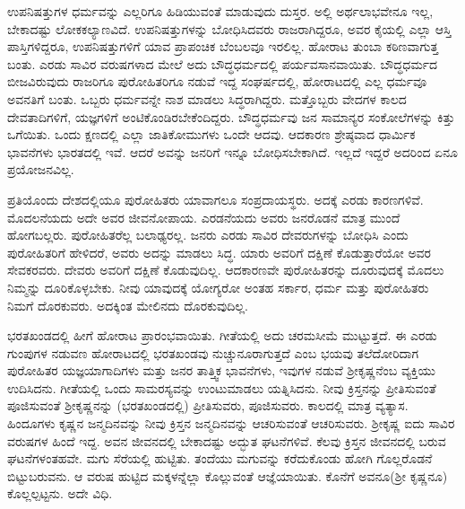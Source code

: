 ಉಪನಿಷತ್ತುಗಳ ಧರ್ಮವನ್ನು ಎಲ್ಲರಿಗೂ ಹಿಡಿಯುವಂತೆ ಮಾಡುವುದು ದುಸ್ತರ. ಅಲ್ಲಿ ಅರ್ಥಲಾಭವೇನೂ ಇಲ್ಲ, ಬೇಕಾದಷ್ಟು ಲೋಕಕಲ್ಯಾಣವಿದೆ. ಉಪನಿಷತ್ತುಗಳನ್ನು ಬೋಧಿಸಿದವರು ರಾಜರಾಗಿದ್ದರೂ, ಅವರ ಕೈಯಲ್ಲಿ ಎಲ್ಲಾ ಆಸ್ತಿ ಪಾಸ್ತಿಗಳಿದ್ದರೂ, ಉಪನಿಷತ್ತುಗಳಿಗೆ ಯಾವ ಪ್ರಾಪಂಚಿಕ ಬೆಂಬಲವೂ ಇರಲಿಲ್ಲ. ಹೋರಾಟ ತುಂಬಾ ಕಠಿಣವಾಗುತ್ತ ಬಂತು. ಎರಡು ಸಾವಿರ ವರುಷಗಳಾದ ಮೇಲೆ ಅದು ಬೌದ್ಧಧರ್ಮದಲ್ಲಿ ಪರ್ಯವಸಾನವಾಯಿತು. ಬೌದ್ಧಧರ್ಮದ ಬೀಜವಿರುವುದು ರಾಜರಿಗೂ ಪುರೋಹಿತರಿಗೂ ನಡುವೆ ಇದ್ದ ಸಂಘರ್ಷದಲ್ಲಿ, ಹೋರಾಟದಲ್ಲಿ ಎಲ್ಲ ಧರ್ಮವೂ ಅವನತಿಗೆ ಬಂತು. ಒಬ್ಬರು ಧರ್ಮವನ್ನೇ ನಾಶ ಮಾಡಲು ಸಿದ್ಧರಾಗಿದ್ದರು. ಮತ್ತೊಬ್ಬರು ವೇದಗಳ ಕಾಲದ ದೇವತಾದಿಗಳಿಗೆ, ಯಜ್ಞಗಳಿಗೆ ಅಂಟಿಕೊಂಡಿರಬೇಕೆಂದಿದ್ದರು. ಬೌದ್ಧಧರ್ಮವು ಜನ ಸಾಮಾನ್ಯರ ಸಂಕೋಲೆಗಳನ್ನು ಕಿತ್ತು ಒಗೆಯಿತು. ಒಂದು ಕ್ಷಣದಲ್ಲಿ ಎಲ್ಲಾ ಜಾತಿಕೋಮುಗಳು ಒಂದೇ ಆದವು. ಆದಕಾರಣ ಶ್ರೇಷ್ಠವಾದ ಧಾರ್ಮಿಕ ಭಾವನೆಗಳು ಭಾರತದಲ್ಲಿ ಇವೆ. ಆದರೆ ಅವನ್ನು ಜನರಿಗೆ ಇನ್ನೂ ಬೋಧಿಸಬೇಕಾಗಿದೆ. ಇಲ್ಲದೆ ಇದ್ದರೆ ಅದರಿಂದ ಏನೂ ಪ್ರಯೋಜನವಿಲ್ಲ.

ಪ್ರತಿಯೊಂದು ದೇಶದಲ್ಲಿಯೂ ಪುರೋಹಿತರು ಯಾವಾಗಲೂ ಸಂಪ್ರದಾಯಸ್ಥರು. ಅದಕ್ಕೆ ಎರಡು ಕಾರಣಗಳಿವೆ. ಮೊದಲನೆಯದು ಅದೇ ಅವರ ಜೀವನೋಪಾಯ. ಎರಡನೆಯದು ಅವರು ಜನರೊಡನೆ ಮಾತ್ರ ಮುಂದೆ ಹೋಗಬಲ್ಲರು. ಪುರೋಹಿತರೆಲ್ಲ ಬಲಾಢ್ಯರಲ್ಲ. ಜನರು ಎರಡು ಸಾವಿರ ದೇವರುಗಳನ್ನು ಬೋಧಿಸಿ ಎಂದು ಪುರೋಹಿತರಿಗೆ ಹೇಳಿದರೆ, ಅವರು ಅದನ್ನು ಮಾಡಲು ಸಿದ್ಧ. ಯಾರು ಅವರಿಗೆ ದಕ್ಷಿಣೆ ಕೊಡುತ್ತಾರೆಯೋ ಅವರ ಸೇವಕರವರು. ದೇವರು ಅವರಿಗೆ ದಕ್ಷಿಣೆ ಕೊಡುವುದಿಲ್ಲ. ಆದಕಾರಣವೇ ಪುರೋಹಿತರನ್ನು ದೂರುವುದಕ್ಕೆ ಮೊದಲು ನಿಮ್ಮನ್ನು ದೂರಿಕೊಳ್ಳಬೇಕು. ನೀವು ಯಾವುದಕ್ಕೆ ಯೋಗ್ಯರೋ ಅಂತಹ ಸರ್ಕಾರ, ಧರ್ಮ ಮತ್ತು ಪುರೋಹಿತರು ನಿಮಗೆ ದೊರಕುವರು. ಅದಕ್ಕಿಂತ ಮೇಲಿನದು ದೊರಕುವುದಿಲ್ಲ.

ಭರತಖಂಡದಲ್ಲಿ ಹೀಗೆ ಹೋರಾಟ ಪ್ರಾರಂಭವಾಯಿತು. ಗೀತೆಯಲ್ಲಿ ಅದು ಚರಮಸೀಮೆ ಮುಟ್ಟುತ್ತದೆ. ಈ ಎರಡು ಗುಂಪುಗಳ ನಡುವಣ ಹೋರಾಟದಲ್ಲಿ ಭರತಖಂಡವು ನುಚ್ಚುನೂರಾಗುತ್ತದೆ ಎಂಬ ಭಯವು ತಲೆದೋರಿದಾಗ ಪುರೋಹಿತರ ಯಜ್ಞಯಾಗಾದಿಗಳು ಮತ್ತು ಜನರ ತಾತ್ತ್ವಿಕ ಭಾವನೆಗಳು, ಇವುಗಳ ನಡುವೆ ಶ‍್ರೀಕೃಷ್ಣನೆಂಬ ವ್ಯಕ್ತಿಯು ಉದಿಸಿದನು. ಗೀತೆಯಲ್ಲಿ ಒಂದು ಸಾಮರಸ್ಯವನ್ನು ಉಂಟುಮಾಡಲು ಯತ್ನಿಸಿದನು. ನೀವು ಕ್ರಿಸ್ತನನ್ನು ಪ್ರೀತಿಸುವಂತೆ ಪೂಜಿಸುವಂತೆ ಶ‍್ರೀಕೃಷ್ಣನನ್ನು (ಭರತಖಂಡದಲ್ಲಿ) ಪ್ರೀತಿಸು\-ವರು, ಪೂಜಿಸುವರು. ಕಾಲದಲ್ಲಿ ಮಾತ್ರ ವ್ಯತ್ಯಾಸ. ಹಿಂದೂಗಳು ಕೃಷ್ಣನ ಜನ್ಮದಿನವನ್ನು ನೀವು ಕ್ರಿಸ್ತನ ಜನ್ಮದಿನವನ್ನು ಆಚರಿಸುವಂತೆ ಆಚರಿಸುವರು. ಶ‍್ರೀಕೃಷ್ಣ ಐದು ಸಾವಿರ ವರುಷಗಳ ಹಿಂದೆ ಇದ್ದ. ಅವನ ಜೀವನದಲ್ಲಿ ಬೇಕಾದಷ್ಟು ಅದ್ಭುತ ಘಟನೆಗಳಿವೆ. ಕೆಲವು ಕ್ರಿಸ್ತನ ಜೀವನದಲ್ಲಿ ಬರುವ ಘಟನೆಗಳಂತಹವೇ. ಮಗು ಸೆರೆಯಲ್ಲಿ ಹುಟ್ಟಿತು. ತಂದೆಯು ಮಗುವನ್ನು ಕರೆದುಕೊಂಡು ಹೋಗಿ ಗೊಲ್ಲರೊಡನೆ ಬಿಟ್ಟುಬರುವನು. ಆ ವರುಷ ಹುಟ್ಟಿದ ಮಕ್ಕಳನ್ನೆಲ್ಲಾ ಕೊಲ್ಲುವಂತೆ ಆಜ್ಞೆಯಾಯಿತು. ಕೊನೆಗೆ ಅವನೂ\break (ಶ‍್ರೀ ಕೃಷ್ಣನೂ) ಕೊಲ್ಲಲ್ಪಟ್ಟನು. ಅದೇ ವಿಧಿ.

